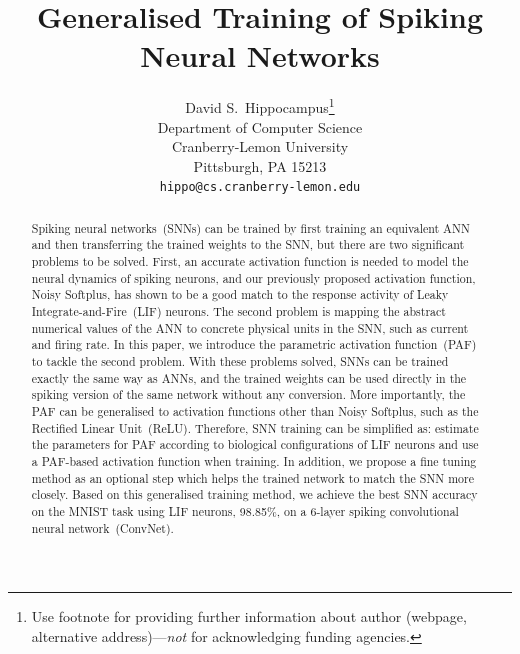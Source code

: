 \documentclass{article}
\title{Generalised Training of Spiking Neural Networks}
\author{
  David S.~Hippocampus\thanks{Use footnote for providing further
    information about author (webpage, alternative
    address)---\emph{not} for acknowledging funding agencies.} \\
  Department of Computer Science\\
  Cranberry-Lemon University\\
  Pittsburgh, PA 15213 \\
  \texttt{hippo@cs.cranberry-lemon.edu} \\
}
\begin{document}

\maketitle

\begin{abstract}
	Spiking neural networks~(SNNs) can be trained by first training an equivalent ANN and then transferring the trained weights to the SNN, but there are two significant problems to be solved.
	First, an accurate activation function is needed to model the neural dynamics of spiking neurons, and our previously proposed activation function, Noisy Softplus, has shown to be a good match to the response activity of Leaky Integrate-and-Fire~(LIF) neurons.
	The second problem is mapping the abstract numerical values of the ANN to concrete physical units in the SNN, such as current and firing rate.
	In this paper, we introduce the parametric activation function~(PAF) to tackle the second problem.
    With these problems solved, SNNs can be trained exactly the same way as ANNs, and the trained weights can be used directly in the spiking version of the same network without any conversion.
    More importantly, the PAF can be generalised to activation functions other than Noisy Softplus, such as the Rectified Linear Unit~(ReLU). %
    Therefore, SNN training can be simplified as: estimate the parameters for PAF according to biological configurations of LIF neurons and use a PAF-based
    activation function when training.
    In addition, we propose a fine tuning method as an optional step which helps the trained network to match the SNN more closely.
    Based on this generalised training method, we achieve the best SNN accuracy on the MNIST task using LIF neurons, 98.85\%, on a 6-layer spiking convolutional neural network~(ConvNet).
    


 
\end{abstract}
\end{document}
